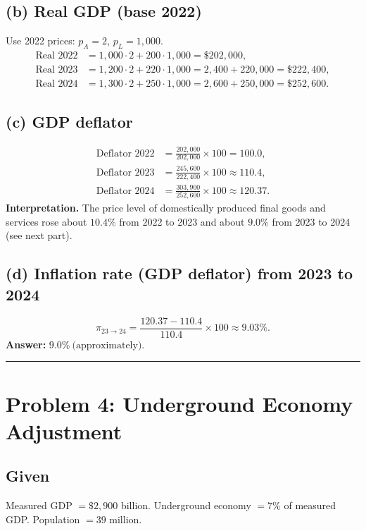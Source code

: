 \documentclass[11pt]{article}
\begin{document}
\subsection*{(b) Real GDP (base 2022)}
Use 2022 prices: \(p_A=2\), \(p_L=1{,}000\).
\[
\begin{aligned}
\text{Real }2022 &= 1{,}000\cdot 2 + 200\cdot 1{,}000 = \$202{,}000,\\
\text{Real }2023 &= 1{,}200\cdot 2 + 220\cdot 1{,}000 = 2{,}400 + 220{,}000 = \$222{,}400,\\
\text{Real }2024 &= 1{,}300\cdot 2 + 250\cdot 1{,}000 = 2{,}600 + 250{,}000 = \$252{,}600.
\end{aligned}
\]

\subsection*{(c) GDP deflator}
\[
\begin{aligned}
\text{Deflator }2022 &= \frac{202{,}000}{202{,}000}\times 100 = 100.0,\\
\text{Deflator }2023 &= \frac{245{,}600}{222{,}400}\times 100 \approx 110.4,\\
\text{Deflator }2024 &= \frac{303{,}900}{252{,}600}\times 100 \approx 120.37.
\end{aligned}
\]
\textbf{Interpretation.} The price level of domestically produced final goods and services rose about \(10.4\%\) from 2022 to 2023 and about \(9.0\%\) from 2023 to 2024 (see next part).

\subsection*{(d) Inflation rate (GDP deflator) from 2023 to 2024}
\[
\pi_{23\to 24} = \frac{120.37 - 110.4}{110.4}\times 100 \approx 9.03\%.
\]
\textbf{Answer:} \(\boxed{9.0\%\ \text{(approximately)}}\).

\bigskip
\hrule
\bigskip

\section*{Problem 4: Underground Economy Adjustment}

\subsection*{Given}
Measured GDP \(= \$2{,}900\) billion. Underground economy \(=7\%\) of measured GDP. Population \(=39\) million.
\end{document}

